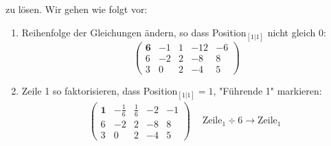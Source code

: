 \documentclass[11pt, openany]{book}
\begin{document}
zu lösen. Wir gehen wie folgt vor:

\begin{enumerate}
    \item Reihenfolge der Gleichungen ändern, so dass Position$_{[1|1]}$ nicht gleich 0:
    {\small
    \[
    \left(
    \begin{array}{cccc|c}
      \textbf{6} & -1 & 1 & -12 & -6 \\
      6 & -2 & 2 & -8 & 8 \\
      3 & 0 & 2 & -4 & 5
    \end{array}
    \right)
    \]}
    
    \item Zeile 1 so faktorisieren, dass Position$_{[1|1]} = 1$, "Führende 1" markieren:
    {\small
    \[
    \begin{array}{c|c}
      \left(\begin{array}{cccc|c}
        \textbf{1} & -\frac{1}{6} & \frac{1}{6} & -2 & -1 \\
        6 & -2 & 2 & -8 & 8 \\
        3 & 0 & 2 & -4 & 5
      \end{array}\right) & \begin{array}{l}
        \text{Zeile}_1 \div 6 \to \text{Zeile}_1
      \end{array}
    \end{array}
    \]}
    

\end{enumerate}
\end{document}

